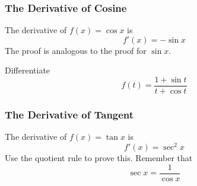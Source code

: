 \documentclass[xcolor=dvipsnames]{beamer}
\begin{document}
\begin{frame}
  \frametitle{The Derivative of Cosine}
The derivative of $f(x)=\cos{}x$ is 
\begin{equation}
  \label{eq:ahfiefev}
  f'(x)=-\sin{}x
\end{equation}
The proof is analogous to the proof for $\sin{}x$.

{\ubung} Differentiate 
\begin{equation}
  \label{eq:afeizeix}
  f(t)=\frac{1+\sin{}t}{t+\cos{}t}
\end{equation}
\end{frame}

\begin{frame}
  \frametitle{The Derivative of Tangent}
The derivative of $f(x)=\tan{}x$ is 
\begin{equation}
  \label{eq:uulohjeo}
  f'(x)=\sec^{2}x
\end{equation}
Use the quotient rule to prove this. Remember that 
\begin{equation}
  \label{eq:shooceid}
  \sec{}x=\frac{1}{\cos{}x}
\end{equation}
\end{frame}
\end{document}
